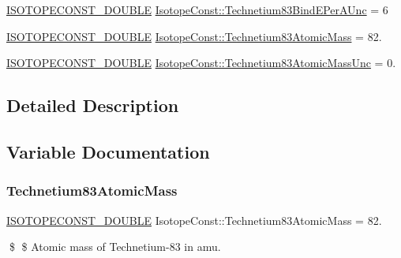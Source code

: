\begin{DoxyCompactItemize}
\mbox{\hyperlink{group___isotope_const-_macros_ga8f45a7272ce02c0b4c65c44636ed719a}{I\+S\+O\+T\+O\+P\+E\+C\+O\+N\+S\+T\+\_\+\+D\+O\+U\+B\+LE}} \mbox{\hyperlink{group___isotope_const-_technetium-_tc83_ga443c5360c2cc3da4edb4897f8da5ca26}{Isotope\+Const\+::\+Technetium83\+Bind\+E\+Per\+A\+Unc}} = 6
\item 
\mbox{\hyperlink{group___isotope_const-_macros_ga8f45a7272ce02c0b4c65c44636ed719a}{I\+S\+O\+T\+O\+P\+E\+C\+O\+N\+S\+T\+\_\+\+D\+O\+U\+B\+LE}} \mbox{\hyperlink{group___isotope_const-_technetium-_tc83_ga0fb5c933b1138a55506e45cc700090bf}{Isotope\+Const\+::\+Technetium83\+Atomic\+Mass}} = 82.
\item 
\mbox{\hyperlink{group___isotope_const-_macros_ga8f45a7272ce02c0b4c65c44636ed719a}{I\+S\+O\+T\+O\+P\+E\+C\+O\+N\+S\+T\+\_\+\+D\+O\+U\+B\+LE}} \mbox{\hyperlink{group___isotope_const-_technetium-_tc83_ga5e9b866a9db744d8bd387afb71a65511}{Isotope\+Const\+::\+Technetium83\+Atomic\+Mass\+Unc}} = 0.
\end{DoxyCompactItemize}


\subsection{Detailed Description}


\subsection{Variable Documentation}
\mbox{\label{group___isotope_const-_technetium-_tc83_ga0fb5c933b1138a55506e45cc700090bf}} 
\subsubsection{\texorpdfstring{Technetium83\+Atomic\+Mass}{Technetium83AtomicMass}}
{\footnotesize\ttfamily \mbox{\hyperlink{group___isotope_const-_macros_ga8f45a7272ce02c0b4c65c44636ed719a}{I\+S\+O\+T\+O\+P\+E\+C\+O\+N\+S\+T\+\_\+\+D\+O\+U\+B\+LE}} Isotope\+Const\+::\+Technetium83\+Atomic\+Mass = 82.}

\$ \$ Atomic mass of Technetium-\/83 in amu. \mbox{\label{group___isotope_const-_technetium-_tc83_ga5e9b866a9db744d8bd387afb71a65511}} 
